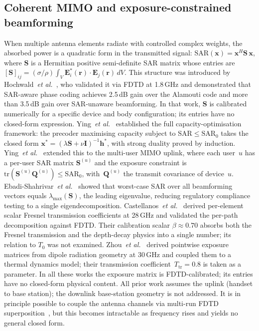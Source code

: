 \documentclass[11pt,a4paper]{article}
\theoremstyle{definition}      %
\newcommand{\rr}{\mathbf{r}}
\begin{document}
\subsection{Coherent MIMO and exposure-constrained beamforming}

When multiple antenna elements radiate with controlled complex
weights, the absorbed power is a quadratic form in the transmitted
signal: $\mathrm{SAR}(\mathbf{x}) = \mathbf{x}^H \mathbf{S}\,
\mathbf{x}$, where $\mathbf{S}$ is a Hermitian positive
semi-definite SAR matrix whose entries are
$[\mathbf{S}]_{ij} = (\sigma/\rho)\int_V \mathbf{E}_i^*(\rr)\cdot
\mathbf{E}_j(\rr)\,dV$.
This structure was introduced by
Hochwald~\textit{et al.}~\cite{Hochwald2014}, who validated it via
FDTD at 1.8\,GHz and demonstrated that SAR-aware phase coding
achieves 2.5\,dB gain over the Alamouti code and more than 3.5\,dB
gain over SAR-unaware beamforming.
In that work, $\mathbf{S}$ is calibrated numerically for a specific
device and body configuration; its entries have no closed-form
expression.
Ying~\textit{et al.}~\cite{Ying2015} established the full
capacity-optimisation framework: the precoder maximising capacity
subject to $\mathrm{SAR} \le \mathrm{SAR}_0$ takes the closed form
$\mathbf{x}^* = (\lambda\mathbf{S} + \nu\mathbf{I})^{-1}
\mathbf{h}^*$, with strong duality proved by induction.
Ying~\textit{et al.}~\cite{Ying2017} extended this to the multi-user
MIMO uplink, where each user~$u$ has a per-user SAR matrix
$\mathbf{S}^{(u)}$ and the exposure constraint is
$\mathrm{tr}(\mathbf{S}^{(u)}\mathbf{Q}^{(u)}) \le \mathrm{SAR}_0$,
with~$\mathbf{Q}^{(u)}$ the transmit covariance of device~$u$.
Ebadi-Shahrivar~\textit{et al.}~\cite{Ebadi2019} showed that
worst-case SAR over all beamforming vectors equals
$\lambda_{\max}(\mathbf{S})$, the leading eigenvalue, reducing
regulatory compliance testing to a single eigendecomposition.
Castellanos~\textit{et al.}~\cite{Castellanos2020}
derived per-element scalar Fresnel transmission coefficients at
28\,GHz and validated the per-path decomposition against FDTD.
Their calibration scalar $\beta \approx 0.70$ absorbs both the
Fresnel transmission and the depth-decay physics into a single number;
its relation to $T_0$ was not examined.
Zhou~\textit{et al.}~\cite{Zhou2026} derived pointwise exposure
matrices from dipole radiation geometry at 30\,GHz and coupled them
to a thermal dynamics model; their transmission
coefficient~$T_{\mathrm{tr}} = 0.8$ is taken as a parameter.
In all these works the exposure matrix is FDTD-calibrated; its
entries have no closed-form physical content.
All prior work assumes the uplink (handset to base station);
the downlink base-station geometry is not addressed.
It is in principle possible to couple the antenna channels via
multi-run FDTD
superposition~\cite{Shikhantsov2020,Wydaeghe2026npj}, but this
becomes intractable as frequency rises and yields no general closed
form.
\end{document}
